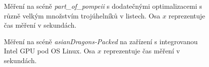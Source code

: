 \documentclass[report,11pt]{elsarticle}
\begin{document}
\begin{figure}
    \begin{center}
        
    \end{center}
    \caption{Měření na scéně \textit{part\_of\_pompeii} s dodatečnými optimalizacemi
             s různě velkým množstvím trojúhelníků v listech. Osa $x$ reprezentuje
             čas měření v sekundách.}
    \label{measure:AllOptim:part_of_pompeii}
\end{figure}


\begin{figure}
    \begin{center}
        
    \end{center}
    \caption{Měření na scéně \textit{asianDragons-Packed} na zařízení s integrovanou
             Intel GPU pod OS Linux. Osa $x$ reprezentuje čas měření v sekundách.}
    \label{measure:LaptopAllOptim:asianDragons-Packed}
\end{figure}




\end{document}

